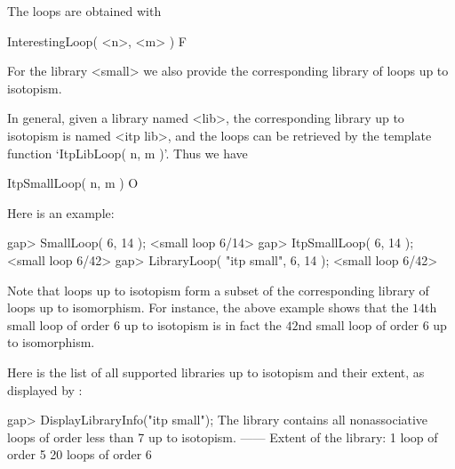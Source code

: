 The loops are obtained with

\>InterestingLoop( <n>, <m> ) F


For the library <small> we also provide the corresponding library of loops up
to isotopism.

In general, given a library named <lib>, the corresponding library up to
isotopism is named <itp lib>, and the loops can be retrieved by the template
function `ItpLibLoop( n, m )'. Thus we have

\>ItpSmallLoop( n, m ) O

Here is an example:

\beginexample
gap> SmallLoop( 6, 14 );
<small loop 6/14>
gap> ItpSmallLoop( 6, 14 );
<small loop 6/42>
gap> LibraryLoop( "itp small", 6, 14 );
<small loop 6/42>
\endexample

Note that loops up to isotopism form a subset of the corresponding library of
loops up to isomorphism. For instance, the above example shows that the $14$th
small loop of order $6$ up to isotopism is in fact the $42$nd small loop of
order $6$ up to isomorphism.

Here is the list of all supported libraries up to isotopism and their extent,
as displayed by \LOOPS:

\beginexample
gap> DisplayLibraryInfo("itp small");
The library contains all nonassociative loops of order less than 7 up to
isotopism.
------
Extent of the library:
   1 loop of order 5
   20 loops of order 6
\endexample
